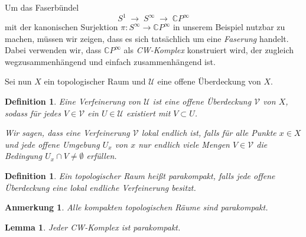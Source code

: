 \documentclass[12pt, hidelinks]{article}
\numberwithin{conj}{section}
\newtheorem{definition}[conj]{Definition}
\newtheorem{remark}[conj]{Anmerkung}
\newtheorem{lemma}[conj]{Lemma}
\begin{document}
                \smallskip
                
                Um das Faserbündel
                \[
                    S^1 \;\longrightarrow\; S^\infty \;\longrightarrow\; \mathbb{C}P^\infty
                \]
                mit der kanonischen Surjektion \(\pi : S^\infty \to \mathbb{C}P^\infty\) in unserem Beispiel nutzbar zu machen, müssen wir zeigen, dass es sich tatsächlich um eine \emph{Faserung} handelt. Dabei verwenden wir, dass \(\mathbb{C}P^\infty\) als \emph{CW-Komplex} konstruiert wird, der zugleich wegzusammenhängend und einfach zusammenhängend ist.
                
                \smallskip
                
                Sei nun \(X\) ein topologischer Raum und \(\mathcal{U}\) eine offene Überdeckung von \(X\).
                
                \begin{definition}
                    Eine \emph{Verfeinerung} von \(\mathcal{U}\) ist eine offene Überdeckung \(\mathcal{V}\) von \(X\), sodass für jedes \(V \in \mathcal{V}\) ein \(U \in \mathcal{U}\) existiert mit \(V \subset U\).
                    
                    Wir sagen, dass eine Verfeinerung \(\mathcal{V}\) \emph{lokal endlich} ist, falls für alle Punkte \(x \in X\) und jede offene Umgebung \(U_x\) von \(x\) nur endlich viele Mengen \(V \in \mathcal{V}\) die Bedingung \(U_x \cap V \neq \emptyset\) erfüllen.
                \end{definition}
                
                \begin{definition}
                    Ein topologischer Raum heißt \emph{parakompakt}, falls jede offene Überdeckung eine lokal endliche Verfeinerung besitzt.
                \end{definition}
                
                \begin{remark}
                    Alle kompakten topologischen Räume sind parakompakt.
                \end{remark}
                
                \begin{lemma}
                    Jeder \emph{CW-Komplex} ist parakompakt.
                \end{lemma}
                
\end{document}
